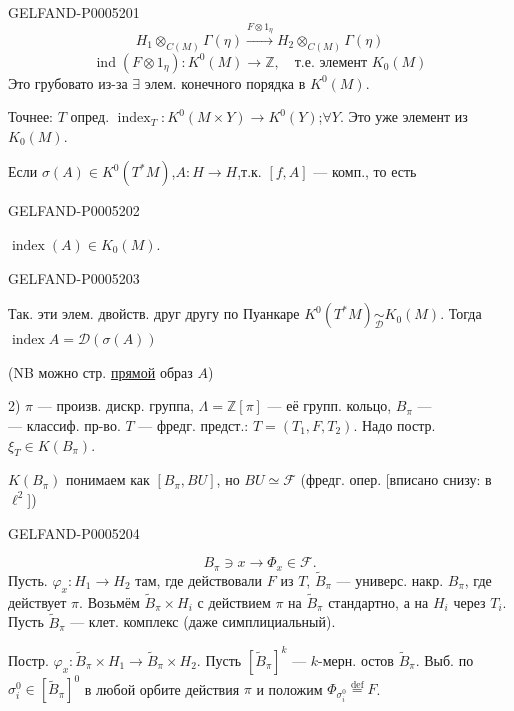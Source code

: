 \begin{GelfandAdjacentEvidence}{GELFAND-P000520}{1}
\[
H_1\otimes_{C(M)}\Gamma(\eta)
\overset{F\otimes 1_\eta}{\longrightarrow}
H_2\otimes_{C(M)}\Gamma(\eta)
\]
\[
\operatorname{ind}(F\otimes1_\eta):K^0(M)\to\mathbb Z,
\quad\text{т.е. элемент }K_0(M)
\]
Это грубовато из-за $\exists$ элем. конечного порядка в $K^0(M)$.

Точнее: $T$ опред. $\operatorname{index}_T:K^0(M\times Y)\to K^0(Y)$;\quad $\forall Y$.
Это уже элемент из $K_0(M)$.

Если $\sigma(A)\in K^0(T^*M)$,\quad $A:H\to H$,\quad т.к. $[f,A]$ —
комп., то есть
\end{GelfandAdjacentEvidence}
\begin{GelfandAdjacentEvidence}{GELFAND-P000520}{2}

$\operatorname{index}(A)\in K_0(M)$.
\end{GelfandAdjacentEvidence}
\begin{GelfandAdjacentEvidence}{GELFAND-P000520}{3}

Так. эти элем. двойств. друг другу по Пуанкаре
$K^0(T^*M)\underset{\mathcal D}{\sim}K_0(M)$.
Тогда $\operatorname{index}A=\mathcal D(\sigma(A))$

(NB можно стр. \uline{прямой} образ $A$)

2) $\pi$ — произв. дискр. группа, $\Lambda=\mathbb Z[\pi]$ — её групп. кольцо, $B_\pi$ —\\
— классиф. пр-во. $T$ — фредг. предст.: $T=(T_1,F,T_2)$. Надо постр.
$\xi_T\in K(B_\pi)$.

$K(B_\pi)$ понимаем как $[B_\pi,BU]$, но $BU\simeq\mathcal F$ (фредг. опер. [вписано снизу: в $\ell^2$])
\end{GelfandAdjacentEvidence}
\begin{GelfandAdjacentEvidence}{GELFAND-P000520}{4}

\[
B_\pi\ni x\to\Phi_x\in\mathcal F.
\]
Пусть. $\varphi_x:H_1\to H_2$ там, где действовали $F$ из $T$,
$\widetilde B_\pi$ — универс. накр. $B_\pi$, где действует $\pi$.
Возьмём $\widetilde B_\pi\times H_i$ с действием $\pi$ на $\widetilde B_\pi$
стандартно, а на $H_i$ через $T_i$.
Пусть $\widetilde B_\pi$ — клет. комплекс (даже симплициальный).

Постр. $\varphi_x:\widetilde B_\pi\times H_1\to\widetilde B_\pi\times H_2$.
Пусть $[\widetilde B_\pi]^k$ — \mbox{$k$}-мерн. остов $\widetilde B_\pi$.
Выб. по $\sigma_i^0\in[\widetilde B_\pi]^0$ в любой орбите действия
$\pi$ и положим $\Phi_{\sigma_i^0}\overset{\mathrm{def}}{=}F$.
\end{GelfandAdjacentEvidence}
